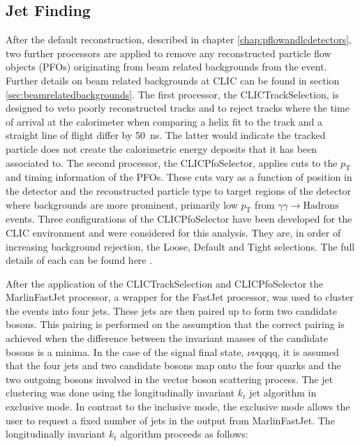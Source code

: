 \subsection{Jet Finding} 
\label{sec:jetpairing}
After the default reconstruction, described in chapter \ref{chap:pflowandlcdetectors}, two further processors are applied to remove any reconstructed particle flow objects (PFOs) originating from beam related backgrounds from the event.  Further details on beam related backgrounds at CLIC can be found in section \ref{sec:beamrelatedbackgrounds}.  The first processor, the CLICTrackSelection, is designed to veto poorly reconstructed tracks and to reject tracks where the time of arrival at the calorimeter when comparing a helix fit to the track and a straight line of flight differ by 50~ns.  The latter would indicate the tracked particle does not create the calorimetric energy deposits that it has been associated to.  The second processor, the CLICPfoSelector, applies cuts to the $p_{\text{T}}$ and timing information of the PFOs.  These cuts vary as a function of position in the detector and the reconstructed particle type to target regions of the detector where backgrounds are more prominent, primarily low $p_{\text{T}}$ from $\gamma\gamma \rightarrow \text{Hadrons}$ events.  Three configurations of the CLICPfoSelector have been developed for the CLIC environment and were considered for this analysis.  They are, in order of increasing background rejection, the Loose, Default and Tight selections. The full details of each can be found here \cite{arXiv:1209.4039}.

After the application of the CLICTrackSelection and CLICPfoSelector the MarlinFastJet processor, a wrapper for the FastJet \cite{Cacciari:2011ma} processor, was used to cluster the events into four jets.  These jets are then paired up to form two candidate bosons.  This pairing is performed on the assumption that the correct pairing is achieved when the difference between the invariant masses of the candidate bosons is a minima.  In the case of the signal final state, $\nu\nu$qqqq, it is assumed that the four jets and two candidate bosons map onto the four quarks and the two outgoing bosons involved in the vector boson scattering process.  The jet clustering was done using the longitudinally invariant $k_{t}$ jet algorithm in exclusive mode.  In contrast to the inclusive mode, the exclusive mode allows the user to request a fixed number of jets in the output from MarlinFastJet.  The longitudinally invariant $k_{t}$ algorithm proceeds as follows:


